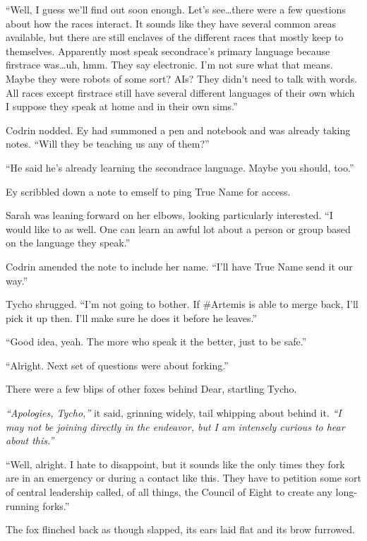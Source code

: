 ``Well, I guess we'll find out soon enough. Let's see\ldots there were a few questions about how the races interact. It sounds like they have several common areas available, but there are still enclaves of the different races that mostly keep to themselves. Apparently most speak secondrace's primary language because firstrace was\ldots uh, hmm. They say electronic. I'm not sure what that means. Maybe they were robots of some sort? AIs? They didn't need to talk with words. All races except firstrace still have several different languages of their own which I suppose they speak at home and in their own sims.''

Codrin nodded. Ey had summoned a pen and notebook and was already taking notes. ``Will they be teaching us any of them?''

``He said he's already learning the secondrace language. Maybe you should, too.''

Ey scribbled down a note to emself to ping True Name for access.

Sarah was leaning forward on her elbows, looking particularly interested. ``I would like to as well. One can learn an awful lot about a person or group based on the language they speak.''

Codrin amended the note to include her name. ``I'll have True Name send it our way.''

Tycho shrugged. ``I'm not going to bother. If \#Artemis is able to merge back, I'll pick it up then. I'll make sure he does it before he leaves.''

``Good idea, yeah. The more who speak it the better, just to be safe.''

``Alright. Next set of questions were about forking.''

There were a few blips of other foxes behind Dear, startling Tycho.

\emph{``Apologies, Tycho,''} it said, grinning widely, tail whipping about behind it. \emph{``I may not be joining directly in the endeavor, but I am intensely curious to hear about this.''}

``Well, alright. I hate to disappoint, but it sounds like the only times they fork are in an emergency or during a contact like this. They have to petition some sort of central leadership called, of all things, the Council of Eight to create any long-running forks.''

The fox flinched back as though slapped, its ears laid flat and its brow furrowed.


